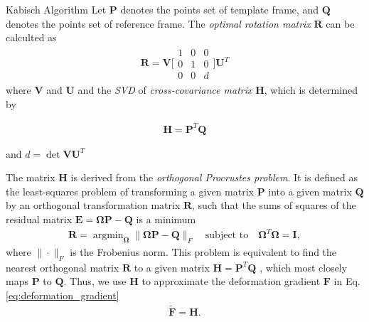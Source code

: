 \documentclass{beamer}
\begin{document}

\begin{frame}
\begin{block}{Kabisch Algorithm}
Let $\mathbf{P}$ denotes the points set of template frame, and $\mathbf{Q}$ denotes the points set of reference frame. The \emph{optimal rotation matrix} $\mathbf{R}$ can be calculted as
\begin{align}
\mathbf{R}=\mathbf{V}\biggl[
\begin{matrix}
   1 & 0 &0\\
   0 & 1 &0 \\
   0 & 0 &d
\end{matrix}
\biggr]\mathbf{U}^T
\end{align}
where $\mathbf{V}$ and $\mathbf{U}$ and the \emph{SVD} of \emph{cross-covariance matrix} $\mathbf{H}$, which is determined by
\begin{theorem}
\begin{align}
\mathbf{H} =\mathbf{P}^T \mathbf{Q}
\end{align}
\end{theorem}
and $d=\det\mathbf{V}\mathbf{U}^T$
\end{block}
\end{frame}


\begin{frame}
The matrix $\mathbf{H}$ is derived from the \emph{orthogonal Procrustes problem}\cite{schonemann1966generalized}. It is defined as the least-squares problem of transforming a given matrix $\mathbf{P}$ into a given matrix $\mathbf{Q}$ by an orthogonal transformation matrix $\mathbf{R}$, such that the sums of squares of the residual matrix $\mathbf{E}=\mathbf{\Omega} \mathbf{P} - \mathbf{Q}$ is a minimum
\begin{align}
\mathbf{R}=\mathop{\arg\min}_{\mathbf{\Omega}} \| \mathbf{\Omega} \mathbf{P} - \mathbf{Q} \|_{F} \quad \mbox{subject to} \quad \mathbf{\Omega}^T\mathbf{\Omega}=\mathbf{I},
\end{align}
where $\| \cdot \|_{F}$ is the Frobenius norm. This problem is equivalent to find the nearest orthogonal matrix $\mathbf{R}$ to a given matrix $\mathbf{H} = \mathbf{P}^T \mathbf{Q}$ \cite{zhang2000flexible}, which most closely maps $\mathbf{P}$ to $\mathbf{Q}$. Thus, we use $\mathbf{H}$ to approximate the deformation gradient $\mathbf{F}$ in Eq. \eqref{eq:deformation_gradient}
\begin{align}
\widetilde{\mathbf{F}} = \mathbf{H}.
\end{align}
\end{frame}
\end{document}

